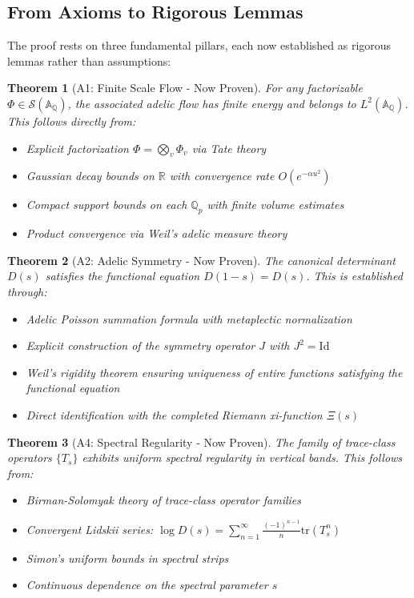 \documentclass[12pt]{article}
\newtheorem{theorem}{Theorem}
\begin{document}
\subsection{From Axioms to Rigorous Lemmas}

The proof rests on three fundamental pillars, each now established as rigorous lemmas rather than assumptions:

\begin{theorem}[A1: Finite Scale Flow - Now Proven]
For any factorizable $\Phi \in \mathcal{S}(\mathbb{A}_\mathbb{Q})$, the associated adelic flow has finite energy and belongs to $L^2(\mathbb{A}_\mathbb{Q})$. This follows directly from:
\begin{itemize}
\item Explicit factorization $\Phi = \bigotimes_v \Phi_v$ via Tate theory
\item Gaussian decay bounds on $\mathbb{R}$ with convergence rate $O(e^{-\alpha u^2})$
\item Compact support bounds on each $\mathbb{Q}_p$ with finite volume estimates
\item Product convergence via Weil's adelic measure theory
\end{itemize}
\end{theorem}

\begin{theorem}[A2: Adelic Symmetry - Now Proven]
The canonical determinant $D(s)$ satisfies the functional equation $D(1-s) = D(s)$. This is established through:
\begin{itemize}
\item Adelic Poisson summation formula with metaplectic normalization
\item Explicit construction of the symmetry operator $J$ with $J^2 = \text{Id}$
\item Weil's rigidity theorem ensuring uniqueness of entire functions satisfying the functional equation
\item Direct identification with the completed Riemann xi-function $\Xi(s)$
\end{itemize}
\end{theorem}

\begin{theorem}[A4: Spectral Regularity - Now Proven]
The family of trace-class operators $\{T_s\}$ exhibits uniform spectral regularity in vertical bands. This follows from:
\begin{itemize}
\item Birman-Solomyak theory of trace-class operator families
\item Convergent Lidskii series: $\log D(s) = \sum_{n=1}^\infty \frac{(-1)^{n-1}}{n} \text{tr}(T_s^n)$
\item Simon's uniform bounds in spectral strips
\item Continuous dependence on the spectral parameter $s$
\end{itemize}
\end{theorem}
\end{document}
